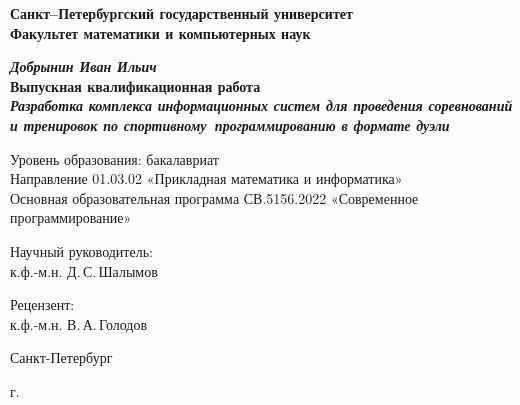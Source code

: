 \begin{titlepage}
\begin{center}

\textbf{Санкт--Петербургский государственный университет}\\
\textbf{Факультет математики и компьютерных наук}


\vspace{35mm}

\textbf{\textit{\large Добрынин Иван Ильич}} \\[8mm]
\textbf{\large Выпускная квалификационная работа}\\[3mm]
\textbf{\textit{\large Разработка комплекса информационных систем для проведения соревнований и тренировок по спортивному~программированию в формате дуэли}}

\vspace{20mm}
Уровень образования: бакалавриат\\
Направление 01.03.02 «Прикладная математика и информатика»\\
Основная образовательная программа СВ.5156.2022
«Современное программирование»\\[25mm]


\begin{flushright}
\begin{minipage}[t]{0.65\textwidth}
{Научный руководитель:} \\
к.ф.-м.н. Д.\,С.\,Шалымов
\vspace{10mm}

{Рецензент:} \\
к.ф.-м.н. В.\,А.\,Голодов
\end{minipage}
\end{flushright}

\vfill

{Санкт-Петербург}
\par{\the\year{} г.}
\end{center}
\end{titlepage}
\restoregeometry
\addtocounter{page}{1}